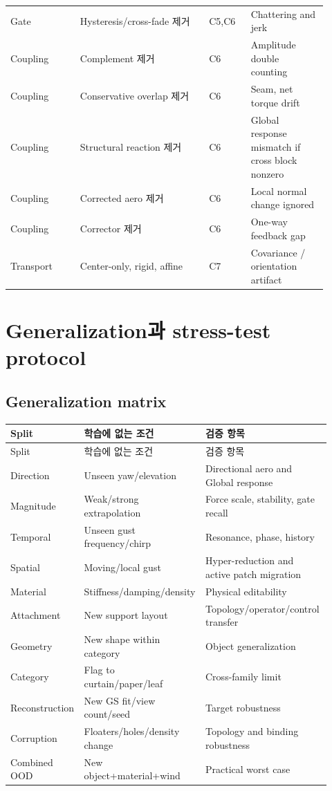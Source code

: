 \documentclass[11pt,a4paper]{article}
\begin{document}
\begin{longtable}{L{0.20\linewidth}L{0.37\linewidth}L{0.12\linewidth}L{0.22\linewidth}}
\addlinespace
Gate & Hysteresis/cross-fade 제거 & C5,C6 & Chattering and jerk \\
\addlinespace
Coupling & Complement 제거 & C6 & Amplitude double counting \\
\addlinespace
Coupling & Conservative overlap 제거 & C6 & Seam, net torque drift \\
\addlinespace
Coupling & Structural reaction 제거 & C6 & Global response mismatch if cross block nonzero \\
\addlinespace
Coupling & Corrected aero 제거 & C6 & Local normal change ignored \\
\addlinespace
Coupling & Corrector 제거 & C6 & One-way feedback gap \\
\addlinespace
Transport & Center-only, rigid, affine & C7 & Covariance / orientation artifact \\
\bottomrule
\end{longtable}

\section{Generalization과 stress-test protocol}

\subsection{Generalization matrix}

\begin{longtable}{L{0.22\linewidth}L{0.31\linewidth}L{0.39\linewidth}}
\toprule
Split & 학습에 없는 조건 & 검증 항목 \\
\midrule
\endfirsthead
\toprule
Split & 학습에 없는 조건 & 검증 항목 \\
\midrule
\endhead
Direction & Unseen yaw/elevation & Directional aero and Global response \\
\addlinespace
Magnitude & Weak/strong extrapolation & Force scale, stability, gate recall \\
\addlinespace
Temporal & Unseen gust frequency/chirp & Resonance, phase, history \\
\addlinespace
Spatial & Moving/local gust & Hyper-reduction and active patch migration \\
\addlinespace
Material & Stiffness/damping/density & Physical editability \\
\addlinespace
Attachment & New support layout & Topology/operator/control transfer \\
\addlinespace
Geometry & New shape within category & Object generalization \\
\addlinespace
Category & Flag to curtain/paper/leaf & Cross-family limit \\
\addlinespace
Reconstruction & New GS fit/view count/seed & Target robustness \\
\addlinespace
Corruption & Floaters/holes/density change & Topology and binding robustness \\
\addlinespace
Combined OOD & New object+material+wind & Practical worst case \\
\bottomrule
\end{longtable}
\end{document}
